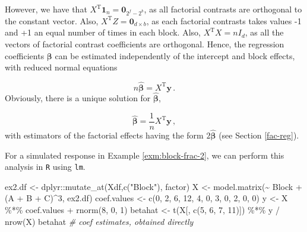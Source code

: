 \documentclass[
]{book}
\newenvironment{Shaded}{\begin{snugshade}}{\end{snugshade}}
\newcommand{\CommentTok}[1]{\textcolor[rgb]{0.56,0.35,0.01}{\textit{#1}}}
\newcommand{\DecValTok}[1]{\textcolor[rgb]{0.00,0.00,0.81}{#1}}
\newcommand{\FunctionTok}[1]{\textcolor[rgb]{0.00,0.00,0.00}{#1}}
\newcommand{\NormalTok}[1]{#1}
\newcommand{\OtherTok}[1]{\textcolor[rgb]{0.56,0.35,0.01}{#1}}
\newcommand{\SpecialCharTok}[1]{\textcolor[rgb]{0.00,0.00,0.00}{#1}}
\newcommand{\StringTok}[1]{\textcolor[rgb]{0.31,0.60,0.02}{#1}}
\theoremstyle{definition}
\theoremstyle{definition}
\theoremstyle{definition}
\theoremstyle{definition}
\theoremstyle{remark}
\begin{document}
However, we have that \(X^{\mathrm{T}}\boldsymbol{1}_n = \boldsymbol{0}_{2^{f}-2^b}\), as all factorial contrasts are orthogonal to the constant vector. Also, \(X^{\mathrm{T}}Z = \boldsymbol{0}_{d\times b}\), as each factorial contrasts takes values -1 and +1 an equal number of times in each block. Also, \(X^{\mathrm{T}}X = nI_{d}\), as all the vectors of factorial contrast coefficients are orthogonal. Hence, the regression coefficients \(\boldsymbol{\beta}\) can be estimated independently of the intercept and block effects, with reduced normal equations

\[
n\hat{\boldsymbol{\beta}} = X^{\mathrm{T}}\boldsymbol{y}\,.
\]
Obviously, there is a unique solution for \(\hat{\boldsymbol{\beta}}\),

\[
\hat{\boldsymbol{\beta}} = \frac{1}{n}X^{\mathrm{T}}\boldsymbol{y}\,,
\]
with estimators of the factorial effects having the form \(2\hat{\boldsymbol{\beta}}\) (see Section \ref{fac-reg}).

For a simulated response in Example \ref{exm:block-frac-2}, we can perform this analysis in \texttt{R} using \texttt{lm}.

\begin{Shaded}
\begin{Highlighting}[]
\NormalTok{ex2.df }\OtherTok{\textless{}{-}}\NormalTok{ dplyr}\SpecialCharTok{::}\FunctionTok{mutate\_at}\NormalTok{(Xdf,}\FunctionTok{c}\NormalTok{(}\StringTok{"Block"}\NormalTok{), factor)}
\NormalTok{X }\OtherTok{\textless{}{-}} \FunctionTok{model.matrix}\NormalTok{(}\SpecialCharTok{\textasciitilde{}}\NormalTok{ Block }\SpecialCharTok{+}\NormalTok{ (A }\SpecialCharTok{+}\NormalTok{ B }\SpecialCharTok{+}\NormalTok{ C)}\SpecialCharTok{\^{}}\DecValTok{3}\NormalTok{, ex2.df)}
\NormalTok{coef.values }\OtherTok{\textless{}{-}} \FunctionTok{c}\NormalTok{(}\DecValTok{0}\NormalTok{, }\DecValTok{2}\NormalTok{, }\DecValTok{6}\NormalTok{, }\DecValTok{12}\NormalTok{, }\DecValTok{4}\NormalTok{, }\DecValTok{0}\NormalTok{, }\DecValTok{3}\NormalTok{, }\DecValTok{0}\NormalTok{, }\DecValTok{2}\NormalTok{, }\DecValTok{0}\NormalTok{, }\DecValTok{0}\NormalTok{)}
\NormalTok{y }\OtherTok{\textless{}{-}}\NormalTok{ X }\SpecialCharTok{\%*\%}\NormalTok{ coef.values }\SpecialCharTok{+} \FunctionTok{rnorm}\NormalTok{(}\DecValTok{8}\NormalTok{, }\DecValTok{0}\NormalTok{, }\DecValTok{1}\NormalTok{)}
\NormalTok{betahat }\OtherTok{\textless{}{-}} \FunctionTok{t}\NormalTok{(X[, }\FunctionTok{c}\NormalTok{(}\DecValTok{5}\NormalTok{, }\DecValTok{6}\NormalTok{, }\DecValTok{7}\NormalTok{, }\DecValTok{11}\NormalTok{)]) }\SpecialCharTok{\%*\%}\NormalTok{ y }\SpecialCharTok{/} \FunctionTok{nrow}\NormalTok{(X)}
\NormalTok{betahat }\CommentTok{\# coef estimates, obtained directly}
\end{Highlighting}
\end{Shaded}
\end{document}
